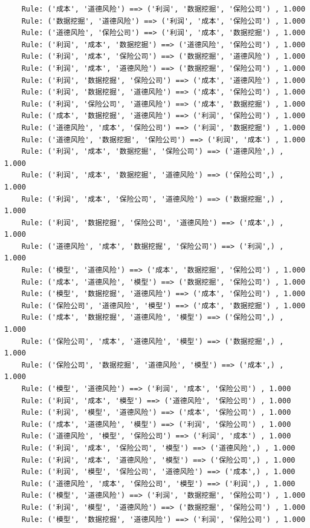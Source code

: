 \documentclass[lang=cn,11pt,a4paper,cite=authoryear]{elegantpaper}
\begin{document}
\begin{lstlisting}
	Rule: ('成本', '道德风险') ==> ('利润', '数据挖掘', '保险公司') , 1.000
	Rule: ('数据挖掘', '道德风险') ==> ('利润', '成本', '保险公司') , 1.000
	Rule: ('道德风险', '保险公司') ==> ('利润', '成本', '数据挖掘') , 1.000
	Rule: ('利润', '成本', '数据挖掘') ==> ('道德风险', '保险公司') , 1.000
	Rule: ('利润', '成本', '保险公司') ==> ('数据挖掘', '道德风险') , 1.000
	Rule: ('利润', '成本', '道德风险') ==> ('数据挖掘', '保险公司') , 1.000
	Rule: ('利润', '数据挖掘', '保险公司') ==> ('成本', '道德风险') , 1.000
	Rule: ('利润', '数据挖掘', '道德风险') ==> ('成本', '保险公司') , 1.000
	Rule: ('利润', '保险公司', '道德风险') ==> ('成本', '数据挖掘') , 1.000
	Rule: ('成本', '数据挖掘', '道德风险') ==> ('利润', '保险公司') , 1.000
	Rule: ('道德风险', '成本', '保险公司') ==> ('利润', '数据挖掘') , 1.000
	Rule: ('道德风险', '数据挖掘', '保险公司') ==> ('利润', '成本') , 1.000
	Rule: ('利润', '成本', '数据挖掘', '保险公司') ==> ('道德风险',) , 1.000
	Rule: ('利润', '成本', '数据挖掘', '道德风险') ==> ('保险公司',) , 1.000
	Rule: ('利润', '成本', '保险公司', '道德风险') ==> ('数据挖掘',) , 1.000
	Rule: ('利润', '数据挖掘', '保险公司', '道德风险') ==> ('成本',) , 1.000
	Rule: ('道德风险', '成本', '数据挖掘', '保险公司') ==> ('利润',) , 1.000
	Rule: ('模型', '道德风险') ==> ('成本', '数据挖掘', '保险公司') , 1.000
	Rule: ('成本', '道德风险', '模型') ==> ('数据挖掘', '保险公司') , 1.000
	Rule: ('模型', '数据挖掘', '道德风险') ==> ('成本', '保险公司') , 1.000
	Rule: ('保险公司', '道德风险', '模型') ==> ('成本', '数据挖掘') , 1.000
	Rule: ('成本', '数据挖掘', '道德风险', '模型') ==> ('保险公司',) , 1.000
	Rule: ('保险公司', '成本', '道德风险', '模型') ==> ('数据挖掘',) , 1.000
	Rule: ('保险公司', '数据挖掘', '道德风险', '模型') ==> ('成本',) , 1.000
	Rule: ('模型', '道德风险') ==> ('利润', '成本', '保险公司') , 1.000
	Rule: ('利润', '成本', '模型') ==> ('道德风险', '保险公司') , 1.000
	Rule: ('利润', '模型', '道德风险') ==> ('成本', '保险公司') , 1.000
	Rule: ('成本', '道德风险', '模型') ==> ('利润', '保险公司') , 1.000
	Rule: ('道德风险', '模型', '保险公司') ==> ('利润', '成本') , 1.000
	Rule: ('利润', '成本', '保险公司', '模型') ==> ('道德风险',) , 1.000
	Rule: ('利润', '成本', '道德风险', '模型') ==> ('保险公司',) , 1.000
	Rule: ('利润', '模型', '保险公司', '道德风险') ==> ('成本',) , 1.000
	Rule: ('道德风险', '成本', '保险公司', '模型') ==> ('利润',) , 1.000
	Rule: ('模型', '道德风险') ==> ('利润', '数据挖掘', '保险公司') , 1.000
	Rule: ('利润', '模型', '道德风险') ==> ('数据挖掘', '保险公司') , 1.000
	Rule: ('模型', '数据挖掘', '道德风险') ==> ('利润', '保险公司') , 1.000

\end{lstlisting}
\end{document}
